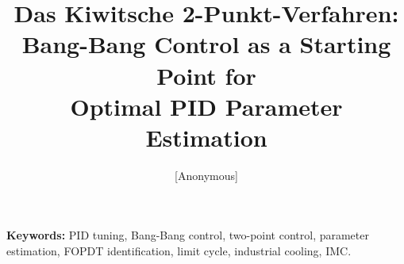 \documentclass[12pt, a4paper]{article}
\title{Das Kiwitsche 2-Punkt-Verfahren:\\
       Bang-Bang Control as a Starting Point for\\
       Optimal PID Parameter Estimation}
\author{[Anonymous]}
\begin{document}
\maketitle

\begin{abstract}

\end{abstract}

\medskip\noindent\textbf{Keywords:} PID tuning, Bang-Bang control, two-point control, parameter estimation,
FOPDT identification, limit cycle, industrial cooling, IMC.










\end{document}
